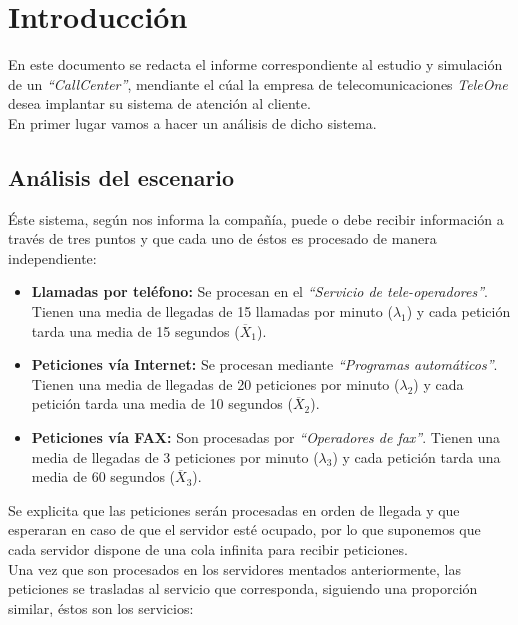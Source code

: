 \section{Introducción}

En este documento se redacta el informe correspondiente al estudio y simulación de un \emph{``CallCenter''}, mendiante el cúal la empresa de telecomunicaciones \emph{TeleOne} desea implantar su sistema de atención al cliente.\\

En primer lugar vamos a hacer un análisis de dicho sistema.

\subsection{Análisis del escenario}
Éste sistema, según nos informa la compañía, puede o debe recibir información a través de tres puntos y que cada uno de éstos es procesado de manera independiente:

\begin{itemize}
  \item \textbf{Llamadas por teléfono:} Se procesan en el \emph{``Servicio de tele-operadores''}. Tienen una media de llegadas de 15 llamadas por minuto ($\lambda_{1}$) y cada petición tarda una media de 15 segundos ($\overline{X}_{1}$).
  \item \textbf{Peticiones vía Internet:} Se procesan mediante \emph{``Programas automáticos''}. Tienen una media de llegadas de 20 peticiones por minuto ($\lambda_{2}$) y cada petición tarda una media de 10 segundos ($\overline{X}_{2}$).
  \item \textbf{Peticiones vía FAX:} Son procesadas por \emph{``Operadores de fax''}. Tienen una media de llegadas de 3 peticiones por minuto ($\lambda_{3}$) y cada petición tarda una media de 60 segundos ($\overline{X}_{3}$).
\end{itemize}

Se explicita que las peticiones serán procesadas en orden de llegada y que esperaran en caso de que el servidor esté ocupado, por lo que suponemos que cada servidor dispone de una cola infinita para recibir peticiones.\\

Una vez que son procesados en los servidores mentados anteriormente, las peticiones se trasladas al servicio que corresponda, siguiendo una proporción similar, éstos son los servicios:

